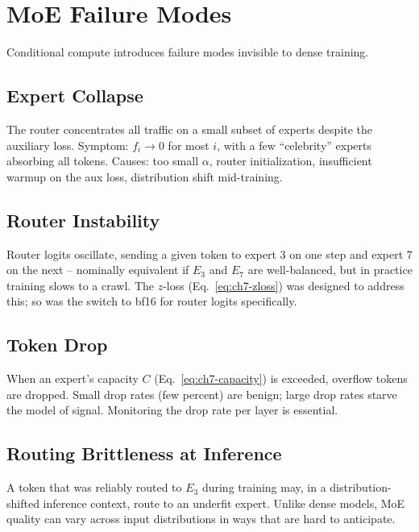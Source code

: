 \section{MoE Failure Modes}

Conditional compute introduces failure modes invisible to dense
training.

\subsection{Expert Collapse}

The router concentrates all traffic on a small subset of experts
despite the auxiliary loss. Symptom: $f_i \to 0$ for most $i$, with a
few ``celebrity'' experts absorbing all tokens. Causes: too small
$\alpha$, router initialization, insufficient warmup on the aux loss,
distribution shift mid-training.

\subsection{Router Instability}

Router logits oscillate, sending a given token to expert 3 on one
step and expert 7 on the next -- nominally equivalent if $E_3$ and
$E_7$ are well-balanced, but in practice training slows to a crawl.
The $z$-loss (Eq.\ \eqref{eq:ch7-zloss}) was designed to address
this; so was the switch to bf16 for router logits specifically.

\subsection{Token Drop}

When an expert's capacity $C$ (Eq.\ \eqref{eq:ch7-capacity}) is
exceeded, overflow tokens are dropped. Small drop rates (few percent)
are benign; large drop rates starve the model of signal. Monitoring
the drop rate per layer is essential.

\subsection{Routing Brittleness at Inference}

A token that was reliably routed to $E_3$ during training may, in a
distribution-shifted inference context, route to an underfit expert.
Unlike dense models, MoE quality can vary across input distributions
in ways that are hard to anticipate.

